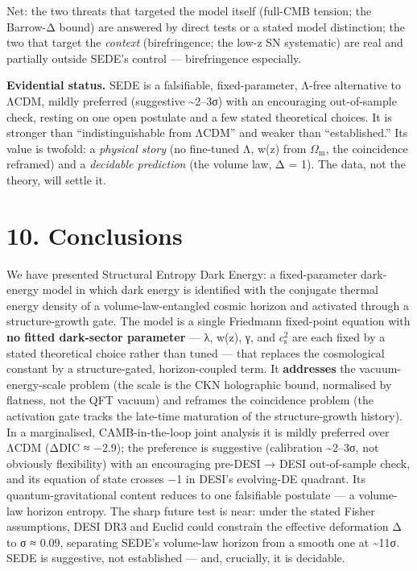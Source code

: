 \documentclass[
  10pt,
]{article}
\begin{document}
Net: the two threats that targeted the model itself (full-CMB tension;
the Barrow-Δ bound) are answered by direct tests or a stated model
distinction; the two that target the \emph{context} (birefringence; the
low-z SN systematic) are real and partially outside SEDE's control ---
birefringence especially.

\textbf{Evidential status.} SEDE is a falsifiable, fixed-parameter,
Λ-free alternative to ΛCDM, mildly preferred (suggestive
\textasciitilde2--3σ) with an encouraging out-of-sample check, resting
on one open postulate and a few stated theoretical choices. It is
stronger than ``indistinguishable from ΛCDM'' and weaker than
``established.'' Its value is twofold: a \emph{physical story} (no
fine-tuned Λ, w(z) from \(\Omega _{\mathrm{m}}\), the coincidence
reframed) and a \emph{decidable prediction} (the volume law, Δ = 1). The
data, not the theory, will settle it.

\section{10. Conclusions}\label{conclusions}

We have presented Structural Entropy Dark Energy: a fixed-parameter
dark-energy model in which dark energy is identified with the conjugate
thermal energy density of a volume-law-entangled cosmic horizon and
activated through a structure-growth gate. The model is a single
Friedmann fixed-point equation with \textbf{no fitted dark-sector
parameter} --- λ, w(z), γ, and \(c_{\mathrm{s}}^{2}\) are each fixed by
a stated theoretical choice rather than tuned --- that replaces the
cosmological constant by a structure-gated, horizon-coupled term. It
\textbf{addresses} the vacuum-energy-scale problem (the scale is the CKN
holographic bound, normalised by flatness, not the QFT vacuum) and
reframes the coincidence problem (the activation gate tracks the
late-time maturation of the structure-growth history). In a
marginalised, CAMB-in-the-loop joint analysis it is mildly preferred
over ΛCDM (ΔDIC ≈ −2.9); the preference is suggestive (calibration
\textasciitilde2--3σ, not obviously flexibility) with an encouraging
pre-DESI → DESI out-of-sample check, and its equation of state crosses
−1 in DESI's evolving-DE quadrant. Its quantum-gravitational content
reduces to one falsifiable postulate --- a volume-law horizon entropy.
The sharp future test is near: under the stated Fisher assumptions, DESI
DR3 and Euclid could constrain the effective deformation Δ to σ ≈ 0.09,
separating SEDE's volume-law horizon from a smooth one at
\textasciitilde11σ. SEDE is suggestive, not established --- and,
crucially, it is decidable.
\end{document}

